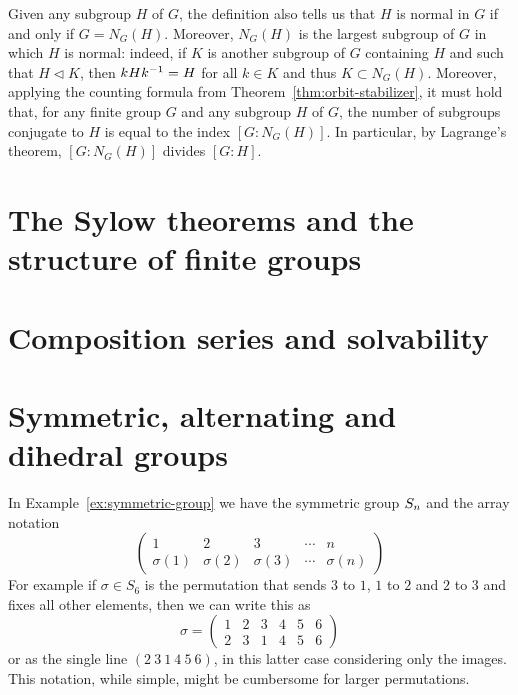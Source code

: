 Given any subgroup \(H\) of \(G\), the definition also tells us that \(H\) is
normal in \(G\) if and only if \(G = N_G(H)\). Moreover, \(N_G(H)\) is the
largest subgroup of \(G\) in which \(H\) is normal: indeed, if \(K\) is another
subgroup of \(G\) containing \(H\) and such that \(H \triangleleft K\), then
\(kHk^{-1} = H\) for all \(k \in K\) and thus \(K \subset N_G(H)\). Moreover,
applying the counting formula from Theorem~\ref{thm:orbit-stabilizer}, it must
hold that, for any finite group \(G\) and any subgroup \(H\) of \(G\), the
number of subgroups conjugate to \(H\) is equal to the index \([G : N_G(H)]\).
In particular, by Lagrange's theorem, \([G : N_G(H)]\) divides \([G : H]\).

\section[Sylow theorems]{The Sylow theorems and the structure of finite groups}
\label{sec:sylow-theorems}


\section[Composition series]{Composition series and solvability}

\section{Symmetric, alternating and dihedral groups}
\label{sec:sym-alt-dihedral}

In Example~\ref{ex:symmetric-group} we have the symmetric group \(S_{n}\) and
the array notation
\[
    \begin{pmatrix}
        1 & 2 & 3 & \cdots & n \\
        \sigma(1) & \sigma(2) & \sigma(3) & \cdots & \sigma(n)
    \end{pmatrix}
\]
For example if \(\sigma \in S_6\) is the permutation that sends \(3\) to \(1\),
\(1\) to \(2\) and \(2\) to \(3\) and fixes all other elements, then we can
write this as
\[
    \sigma = \begin{pmatrix}
        1 & 2 & 3 & 4 & 5 & 6 \\
        2 & 3 & 1 & 4 & 5 & 6
    \end{pmatrix}
\]
or as the single line \((2\ 3\ 1\ 4\ 5\ 6)\), in this latter case considering
only the images. This notation, while simple, might be cumbersome for larger
permutations. 

